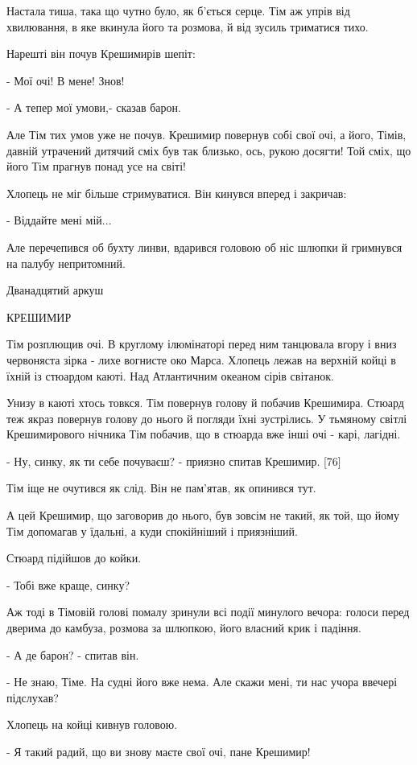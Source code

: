 Настала тиша, така що чутно було, як б'ється серце. Тім аж упрів від хвилювання, в яке вкинула його та розмова, й від зусиль триматися тихо.

Нарешті він почув Крешимирів шепіт:

- Мої очі! В мене! Знов!

- А тепер мої умови,- сказав барон.

Але Тім тих умов уже не почув. Крешимир повернув собі свої очі, а його, Тімів, давній утрачений дитячий сміх був так близько, ось, рукою досягти! Той сміх, що його Тім прагнув понад усе на світі!

Хлопець не міг більше стримуватися. Він кинувся вперед і закричав:

- Віддайте мені мій...

Але перечепився об бухту линви, вдарився головою об ніс шлюпки й гримнувся на палубу непритомний.

Дванадцятий аркуш

КРЕШИМИР

Тім розплющив очі. В круглому ілюмінаторі перед ним танцювала вгору і вниз червоняста зірка - лихе вогнисте око Марса. Хлопець лежав на верхній койці в їхній із стюардом каюті. Над Атлантичним океаном сірів світанок.

Унизу в каюті хтось товкся. Тім повернув голову й побачив Крешимира. Стюард теж якраз повернув голову до нього й погляди їхні зустрілись. У тьмяному світлі Крешимирового нічника Тім побачив, що в стюарда вже інші очі - карі, лагідні.

- Ну, синку, як ти себе почуваєш? - приязно спитав Крешимир. [76]

Тім іще не очутився як слід. Він не пам'ятав, як опинився тут.

А цей Крешимир, що заговорив до нього, був зовсім не такий, як той, що йому Тім допомагав у їдальні, а куди спокійніший і приязніший.

Стюард підійшов до койки.

- Тобі вже краще, синку?

Аж тоді в Тімовій голові помалу зринули всі події минулого вечора: голоси перед дверима до камбуза, розмова за шлюпкою, його власний крик і падіння.

- А де барон? - спитав він.

- Не знаю, Тіме. На судні його вже нема. Але скажи мені, ти нас учора ввечері підслухав?

Хлопець на койці кивнув головою.

- Я такий радий, що ви знову маєте свої очі, пане Крешимир!

